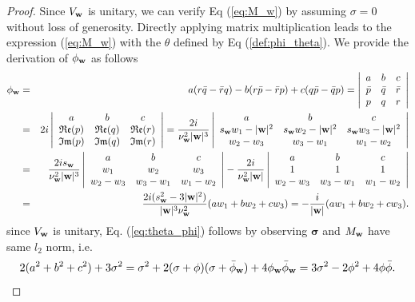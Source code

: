 \documentclass[10pt,reqno]{amsart}
\newcommand{\bS}{\boldsymbol{\sigma}}
\renewcommand{\(}{\left(}
\renewcommand{\)}{\right)}
\newcommand{\bw}{{\bf w}}
\numberwithin{equation}{section}
\begin{document}
\begin{proof}
	Since $V_{\bw}$ is unitary, we can verify Eq (\ref{eq:M_w}) by assuming $\sigma=0$ without loss of generosity. Directly applying matrix multiplication leads to the expression (\ref{eq:M_w}) with the $\theta$ defined by Eq (\ref{def:phi_theta}).  We provide the derivation of $\phi_{\bw}$ as follows
	\begin{eqnarray*}
		\phi_{\bw} &=& a(r\bar q - \bar r q) - b(r\bar p - \bar r p )  +c (q\bar p - \bar q p)= \left|
		\begin{array}{ccc}
			a & b & c\\
			\bar p & \bar q & \bar r \\
			p & q & r \\
		\end{array}
		\right|\\
		&=& 2i \left|
		\begin{array}{ccc}
			a & b & c\\
			\mathfrak{Re}(p) & \mathfrak{Re} (q) & \mathfrak{Re} (r) \\
			\mathfrak{Im}(p) & \mathfrak{Im} (q) & \mathfrak{Im} (r) \\
		\end{array}
		\right|= \frac{2i}{\nu^2_{\bw} |\bw|^3} \left|
		\begin{array}{ccc}
			a & b & c\\
			s_{\bw}w_1-|\bw|^2 & s_{\bw}w_2-|\bw|^2  & s_{\bw}w_3-|\bw|^2 \\
			w_2-w_3 & w_3-w_1 & w_1-w_2 \\
		\end{array}
		\right|\\
		&=&\frac{2i s_{\bw}}{\nu^2_{\bw} |\bw|^3} \left|
		\begin{array}{ccc}
			a & b & c\\
			w_1 & w_2  & w_3 \\
			w_2-w_3 & w_3-w_1 & w_1-w_2 \\
		\end{array}
		\right| - \frac{2i}{\nu^2_{\bw} |\bw|} \left|
		\begin{array}{ccc}
			a & b & c\\
			1 & 1  & 1 \\
			w_2-w_3 & w_3-w_1 & w_1-w_2 \\
		\end{array}
		\right| \\
		&=& \frac{2i (s_{\bw}^2-3|\bw|^2)}{|\bw|^3\nu^2_{\bw}} (aw_1+bw_2+cw_3)= -\frac{i}{|\bw|}(aw_1+bw_2+cw_3).
	\end{eqnarray*}
	since $V_{\bw}$ is unitary,  Eq. (\ref{eq:theta_phi}) follows by observing $\bS$ and $M_{\bw}$ have same $l_2$ norm, i.e.
	\[
	2(a^2+b^2+c^2) + 3\sigma^2 = \sigma^2 + 2(\sigma + \phi) (\sigma + \bar\phi_{\bw} ) + 4\phi_{\bw}\bar\phi_{\bw} = 3\sigma^2 -2\phi^2 +4\phi\bar\phi.
	\]
\end{proof}
\end{document}
